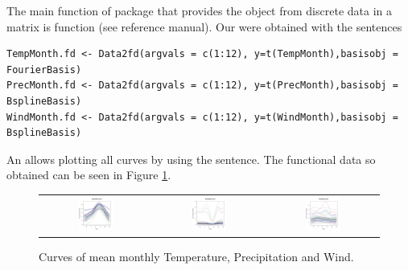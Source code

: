 The main function of  package that provides the  object from discrete data in a matrix is  function (see  reference manual). Our  were obtained with the sentences

\begin{verbatim}
TempMonth.fd <- Data2fd(argvals = c(1:12), y=t(TempMonth),basisobj = FourierBasis)
PrecMonth.fd <- Data2fd(argvals = c(1:12), y=t(PrecMonth),basisobj = BsplineBasis)
WindMonth.fd <- Data2fd(argvals = c(1:12), y=t(WindMonth),basisobj = BsplineBasis)
\end{verbatim}

An  allows plotting all curves by using the   sentence. The functional data so obtained can be seen in Figure \ref{FDCurves}.

\begin{figure}
\begin{center}
\begin{tabular}{ccc}
\includegraphics[width=0.33\textwidth]{Graphs/FDTemp.png} &  \includegraphics[width=0.33\textwidth]{Graphs/FDPrec.png} & \includegraphics[width=0.33\textwidth]{Graphs/FDWind.png} \\
\end{tabular}
\end{center}
\caption{Curves of mean monthly Temperature, Precipitation and Wind.}
\label{FDCurves}
\end{figure}

